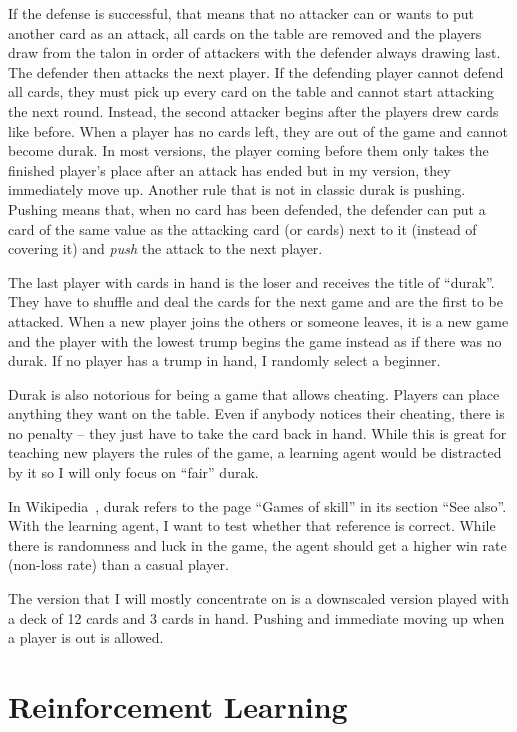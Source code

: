 \documentclass[a4paper,titlepage]{article}
\begin{document}
If the defense is successful, that means that no attacker can or wants to put another card as an attack, all cards on the table are removed and the players draw from the talon in order of attackers with the defender always drawing last. The defender then attacks the next player.
If the defending player cannot defend all cards, they must pick up every card on the table and cannot start attacking the next round. Instead, the second attacker begins after the players drew cards like before.
When a player has no cards left, they are out of the game and cannot become durak. In most versions, the player coming before them only takes the finished player's place after an attack has ended but in my version, they immediately move up.
Another rule that is not in classic durak is pushing. Pushing means that, when no card has been defended, the defender can put a card of the same value as the attacking card (or cards) next to it (instead of covering it) and \emph{push} the attack to the next player.

The last player with cards in hand is the loser and receives the title of ``durak''. They have to shuffle and deal the cards for the next game and are the first to be attacked. When a new player joins the others or someone leaves, it is a new game and the player with the lowest trump begins the game instead as if there was no durak. If no player has a trump in hand, I randomly select a beginner. \medskip

Durak is also notorious for being a game that allows cheating. Players can place anything they want on the table. Even if anybody notices their cheating, there is no penalty -- they just have to take the card back in hand. While this is great for teaching new players the rules of the game, a learning agent would be distracted by it so I will only focus on ``fair'' durak.

In Wikipedia~\cite{wikidurak}, durak refers to the page ``Games of skill'' in its section ``See also''. With the learning agent, I want to test whether that reference is correct. While there is randomness and luck in the game, the agent should get a higher win rate (non-loss rate) than a casual player. \medskip

The version that I will mostly concentrate on is a downscaled version played with a deck of 12 cards and 3 cards in hand. %
Pushing and immediate moving up when a player is out is allowed.

\newpage

\section{Reinforcement Learning}
\end{document}
